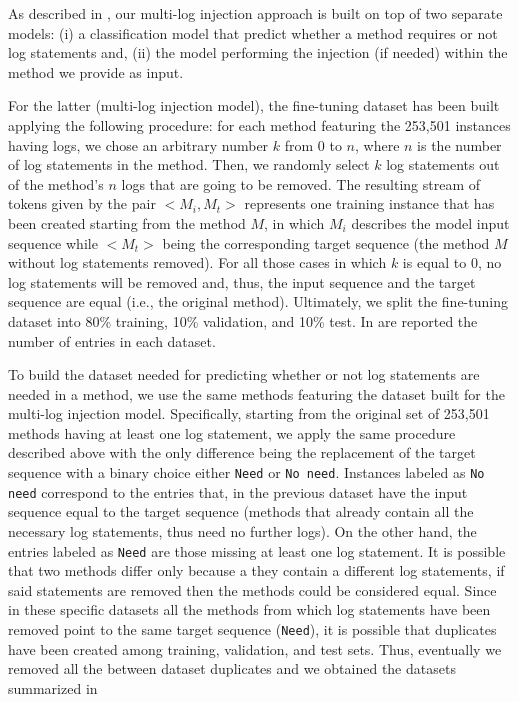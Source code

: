 As described in , our multi-log injection approach is built on top of two separate models: (i) a classification model that predict whether a method requires or not log statements  and, (ii) the model performing the injection (if needed) within the \java method we provide as input.

For the latter (\ie multi-log injection model), the fine-tuning dataset has been built applying the following procedure: for each method featuring the 253,501 instances having logs, we chose an arbitrary number $k$ from 0 to $n$, where $n$ is the number of log statements in the method. Then, we randomly select $k$ log statements out of the method’s $n$ logs that are going to be removed. The resulting stream of tokens given by the pair $<M_i, M_t>$ represents one training instance that has been created starting from the method $M$, in which $M_i$ describes the model input sequence while $<M_t>$ being  the corresponding target sequence (\ie the method $M$ without log statements removed). For all those cases in which $k$ is equal to 0, no log statements will be removed and, thus, the input sequence and the target sequence are equal (i.e., the original \java method). 
Ultimately, we split the fine-tuning dataset into 80\% training, 10\% validation, and 10\% test. In  are reported the number of entries in each dataset.  

To build the dataset needed for predicting whether or not log statements are needed in a \java method, we use the same methods featuring the dataset built for the multi-log injection model. Specifically, starting from the original set of 253,501 \java methods having at least one log statement, we apply the same procedure described above with the only difference being the replacement of the target sequence with a binary choice either  \texttt{Need} or \texttt{No need}. Instances labeled as \texttt{No need} correspond to the entries that, in the previous dataset have the input sequence equal to the target sequence (\ie methods that already contain all the necessary log statements, thus need no further logs). On the other hand, the entries labeled as \texttt{Need} are those missing at least one log statement. It is possible that two methods differ only because a they contain a different log statements, if said statements are removed then the methods could be considered equal. Since in these specific datasets all the methods from which log statements have been removed point to the same target sequence (\ie \texttt{Need}), it is possible that duplicates have been created among training, validation, and test sets. Thus, eventually we removed all the between dataset duplicates and we obtained the datasets summarized in 




